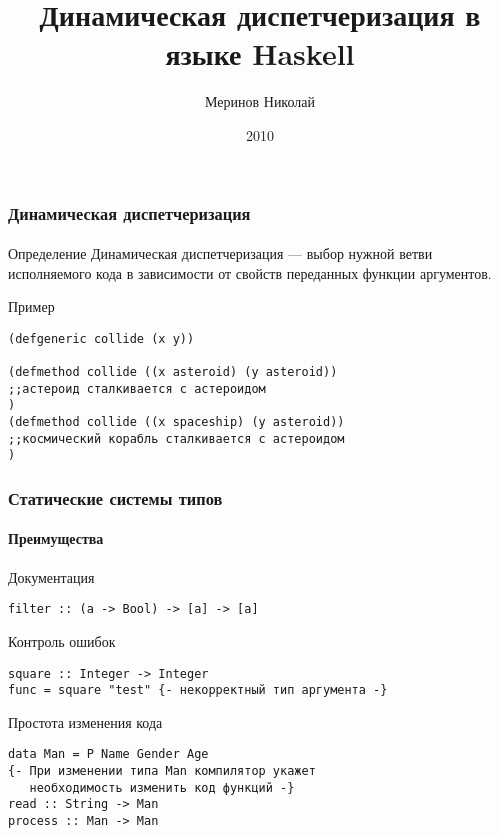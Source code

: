\documentclass[ucs]{beamer}
\title[Динамическая диспетчеризация]{Динамическая диспетчеризация в языке Haskell}
\author{Меринов Николай}
\institute{УрГУ}
\date{2010}
\begin{document}

\begin{frame}
\titlepage
\end{frame}

\begin{frame}[fragile]
  \frametitle{Динамическая диспетчеризация}
  \framesubtitle{}
  \begin{block}{Определение}
    Динамическая диспетчеризация --- выбор нужной ветви исполняемого
    кода в зависимости от свойств переданных функции аргументов.
  \end{block}
  \begin{block}{Пример}
\begin{verbatim}
(defgeneric collide (x y))

(defmethod collide ((x asteroid) (y asteroid))
;;астероид сталкивается с астероидом
)
(defmethod collide ((x spaceship) (y asteroid))
;;космический корабль сталкивается с астероидом
)
\end{verbatim}
  \end{block}
\end{frame}

\begin{frame}[fragile]
  \frametitle{Статические системы типов}
  \framesubtitle{Преимущества}
  \begin{block}{Документация}
\begin{verbatim}
filter :: (a -> Bool) -> [a] -> [a]
\end{verbatim}
  \end{block}

  \begin{block}{Контроль ошибок}
\begin{verbatim}
square :: Integer -> Integer
func = square "test" {- некорректный тип аргумента -}
\end{verbatim}
  \end{block}

  \begin{block}{Простота изменения кода}
\begin{verbatim}
data Man = P Name Gender Age
{- При изменении типа Man компилятор укажет
   необходимость изменить код функций -}
read :: String -> Man
process :: Man -> Man
\end{verbatim}
  \end{block}
\end{frame}
\end{document}
